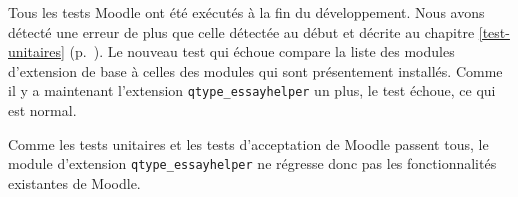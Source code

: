 Tous les tests Moodle ont \'et\'e ex\'ecut\'es \`a la fin du d\'eveloppement.
Nous avons d\'etect\'e une erreur de plus que celle d\'etect\'ee au d\'ebut et d\'ecrite au chapitre \ref{test-unitaires} (p.~\pageref{test-unitaires}).
Le nouveau test qui \'echoue compare la liste des modules d'extension de base \`a celles des modules qui sont pr\'esentement install\'es.
Comme il y a maintenant l'extension \texttt{qtype\_essayhelper} un plus, le test \'echoue, ce qui est normal.

Comme les tests unitaires et les tests d'acceptation de Moodle passent tous, le module d'extension \texttt{qtype\_essayhelper} ne r\'egresse donc pas les fonctionnalit\'es existantes de Moodle.
